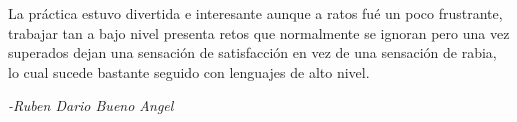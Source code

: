 
%
%
%

%


La práctica estuvo divertida e interesante aunque a ratos fué un poco frustrante, trabajar tan a bajo nivel presenta retos que normalmente se ignoran pero una vez superados dejan una sensación de satisfacción en vez de una sensación de rabia, lo cual sucede bastante seguido con lenguajes de alto nivel.

\begin{flushright} 
	\itshape{-Ruben Dario Bueno Angel}
\end{flushright}

%
